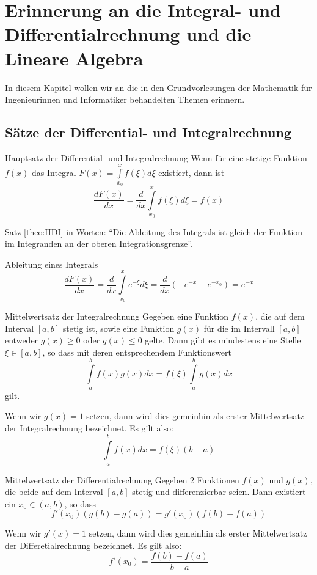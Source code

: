 \chapter[Erinnerung an die \dots]{Erinnerung an die Integral- und
Differentialrechnung und die Lineare Algebra}
In diesem Kapitel wollen wir an die in den Grundvorlesungen der Mathematik für
Ingenieurinnen und Informatiker behandelten Themen erinnern.
\section{Sätze der Differential- und Integralrechnung}
\begin{satz}{Hauptsatz der Differential- und Integralrechnung\label{theo:HSIntegralDiff}}
Wenn für eine stetige Funktion $f(x)$ das Integral
$F(x)=\int\limits_{x_0}^{x}f(\xi)d\xi$ existiert, dann ist
\[
  \frac{dF(x)}{dx}=\frac{d}{dx}\int\limits_{x_0}^{x}f(\xi)d\xi=f(x)
\]
\label{theo:HDI}
\end{satz}
Satz \ref{theo:HDI} in Worten: ``Die Ableitung des Integrals ist gleich der
Funktion im Integranden an der oberen Integrationsgrenze''.
\begin{example}{Ableitung eines Integrals}
\[
 \frac{d F(x)}{dx}=\frac{d}{dx}\int\limits_{x_0}^{x}e^{-\xi}d\xi=
 \frac{d}{dx} \left(-e^{-x}+e^{-x_0}\right)=e^{-x}
\]
\end{example}
\begin{satz}{Mittelwertsatz der Integralrechnung}
  Gegeben eine Funktion $f(x)$, die auf dem Interval $[a,b]$ stetig ist, sowie
  eine Funktion $g(x)$ für die im Intervall $[a,b]$ entweder $g(x)\ge0$ oder
  $g(x)\le0$ gelte. Dann gibt es mindestens eine Stelle $\xi\in[a,b]$, so dass
  mit deren entsprechendem Funktionswert 
  \begin{equation} 
  \int\limits_a^bf(x)g(x)dx=f(\xi)\int\limits_a^bg(x)dx 
  \label{eq:MittelwertInt2} 
  \end{equation}
  gilt.   
\end{satz}
Wenn wir $g(x)=1 $ setzen, dann wird dies gemeinhin als erster
Mittelwertsatz der Integralrechnung bezeichnet. Es gilt also:
\begin{equation} 
  \int\limits_a^bf(x)dx=f(\xi)(b-a)
  \label{eq:MittelwertInt1}
\end{equation}
\begin{satz}{Mittelwertsatz der Differentialrechnung}
  Gegeben 2 Funktionen $f(x)$ und $g(x)$, die beide auf dem Interval $[a,b]$
  stetig und differenzierbar seien. Dann existiert ein $x_0\in(a,b)$, so dass   
  \begin{equation}
    f'(x_0)\left(g(b)-g(a)\right)= g'(x_0)\left(f(b)-f(a)\right)
  \label{eq:MittelwertDiff2}
\end{equation}
\end{satz}
Wenn wir $g'(x)=1 $ setzen, dann wird dies gemeinhin als erster
Mittelwertsatz der Differetialrechnung bezeichnet. Es gilt also:
\begin{equation}
  f'(x_0)=\frac{f(b)-f(a)}{b-a}
  \label{eq:MittelwertDiff1}
\end{equation}
